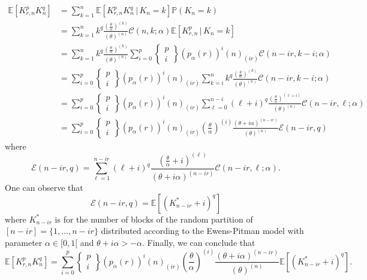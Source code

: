\documentclass[twoside,12pt]{article}
\newcommand{\dP}{\mathbb{P}}
\newcommand{\E}{\mathds{E}}
\begin{document}
\begin{align*}
\E[K_{r,n}^{p}K_{n}^{q}] &= \sum_{k=1}^{n} \E[K_{r,n}^{p} K_{n}^{q}\,|\,K_{n}=k] \dP(K_n=k) \\
&=\sum_{k=1}^{n}k^{q}\frac{\left(\frac{\theta}{\alpha}\right)^{(k)}}{(\theta)^{(n)}}\mathscr{C}(n,k;\alpha)\E[K_{r,n}^{p}\,|\,K_{n}=k]\\
&=\sum_{k=1}^{n}k^{q}\frac{\left(\frac{\theta}{\alpha}\right)^{(k)}}{(\theta)^{(n)}}
\sum_{i=0}^p \left\{ 
\begin{matrix}
p \\i 
\end{matrix}
\right\}
\left(p_\alpha(r)\right)^{i}(n)_{(ir)}\mathscr{C}(n-ir,k-i;\alpha) \\
&=\sum_{i=0}^p \left\{ 
\begin{matrix}
p \\i 
\end{matrix}
\right\}
\left(p_\alpha(r)\right)^{i}(n)_{(ir)}
\sum_{k=i}^{n}k^{q}\frac{\left(\frac{\theta}{\alpha}\right)^{(k)}}{(\theta)^{(n)}}\mathscr{C}(n-ir,k-i;\alpha)\\
&=\sum_{i=0}^p \left\{ 
\begin{matrix}
p \\i 
\end{matrix}
\right\}
\left(p_\alpha(r)\right)^{i}(n)_{(ir)}
\sum_{\ell=0}^{n-i}(\ell+i)^{q}\frac{\left(\frac{\theta}{\alpha}\right)^{(\ell+i)}}{(\theta)^{(n)}}
\mathscr{C}(n-ir,\ell;\alpha)\\
&=\sum_{i=0}^p \left\{ 
\begin{matrix}
p \\i 
\end{matrix}
\right\}
\left(p_\alpha(r)\right)^{i}(n)_{(ir)}
\left(\frac{\theta}{\alpha}\right)^{(i)}
\frac{\left(\theta+i \alpha \right)^{(n-ir)}}{(\theta)^{(n)}}
\mathscr{E}(n-ir,q)
\end{align*}
where
\begin{equation*}
\mathscr{E}(n-ir,q)=\sum_{\ell=1}^{n-ir}(\ell+i)^{q}\frac{\left(\frac{\theta}{\alpha}+i\right)^{(\ell)}}{(\theta+i \alpha)^{(n-ir)}}
\mathscr{C}(n-ir,\ell;\alpha).
\end{equation*}
One can observe that
\begin{displaymath}
\mathscr{E}(n-ir,q)=\E[(K^{\ast}_{n-ir}+i)^{q}]
\end{displaymath}
where $K^{\ast}_{n-ir}$ is for the number of blocks of the random partition of $[n-ir]=\{1,\ldots,n-ir\}$ distributed according to the Ewens-Pitman model with parameter $\alpha\in[0,1[$ and $\theta+i\alpha>-\alpha$.
Finally, we can conclude that
\begin{equation}\label{eq_finalmom}
\E[K_{r,n}^{p}K_{n}^{q}]
= \sum_{i=0}^p \left\{ 
\begin{matrix}
p \\i 
\end{matrix}
\right\}
\left(p_\alpha(r)\right)^{i}(n)_{(ir)}
\left(\frac{\theta}{\alpha}\right)^{(i)}
\frac{\left(\theta+i \alpha \right)^{(n-ir)}}{(\theta)^{(n)}}
\E[(K^{\ast}_{n-ir}+i)^{q}].
\end{equation}
\end{document}
